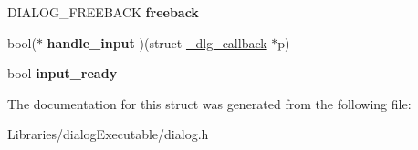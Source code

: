 \begin{DoxyCompactItemize}
\item 
D\+I\+A\+L\+O\+G\+\_\+\+F\+R\+E\+E\+B\+A\+CK {\bfseries freeback}\hypertarget{struct__dlg__callback_a57c483c9f5abd68fa25412e09a5cbc40}{}\label{struct__dlg__callback_a57c483c9f5abd68fa25412e09a5cbc40}

\item 
bool($\ast$ {\bfseries handle\+\_\+input} )(struct \hyperlink{struct__dlg__callback}{\+\_\+dlg\+\_\+callback} $\ast$p)\hypertarget{struct__dlg__callback_a1bbcc44022af5e2d51cf4ea0c9f1d15c}{}\label{struct__dlg__callback_a1bbcc44022af5e2d51cf4ea0c9f1d15c}

\item 
bool {\bfseries input\+\_\+ready}\hypertarget{struct__dlg__callback_a270c3e01590a3f7f43d30b979659dcba}{}\label{struct__dlg__callback_a270c3e01590a3f7f43d30b979659dcba}

\end{DoxyCompactItemize}


The documentation for this struct was generated from the following file\+:\begin{DoxyCompactItemize}
\item 
Libraries/dialog\+Executable/dialog.\+h\end{DoxyCompactItemize}
